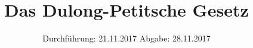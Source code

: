 

\subject{v201}
\title{Das Dulong-Petitsche Gesetz}
\date{%
  Durchführung: 21.11.2017
  \hspace{3em}
  Abgabe: 28.11.2017
}



\maketitle
\thispagestyle{empty}
\tableofcontents
\newpage






\printbibliography{}


